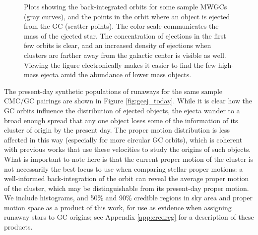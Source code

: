\documentclass[twocolumn,linenumbers]{aastex631}
\begin{document}
\begin{figure*}
    \caption{
        Plots showing the back-integrated orbits for some sample MWGCs (gray curves), and the points in the orbit where an object is ejected from the GC (scatter points).
        The color scale communicates the mass of the ejected star.
        The concentration of ejections in the first few orbits is clear, and an increased density of ejections when clusters are farther away from the galactic center is visible as well.
        Viewing the figure electronically makes it easier to find the few high-mass ejecta amid the abundance of lower mass objects.
    }
    \label{fig:gc_orbit_ejections}
\end{figure*}

The present-day synthetic populations of runaways for the same sample CMC/GC pairings are shown in Figure \ref{fig:gcej_today}.
While it is clear how the GC orbits influence the distribution of ejected objects, the ejecta wander to a broad enough spread that any one object loses some of the information of its cluster of origin by the present day.
The proper motion distribution is less affected in this way (especially for more circular GC orbits), which is coherent with previous works that use these velocities to study the origins of such objects.
What is important to note here is that the current proper motion of the cluster is not necessarily the best locus to use when comparing stellar proper motions: a well-informed back-integration of the orbit can reveal the average proper motion of the cluster, which may be distinguishable from its present-day proper motion.
We include histograms, and 50\% and 90\% credible regions in sky area and proper motion space as a product of this work, for use as evidence when assigning runaway stars to GC origins; see Appendix \ref{app:credreg} for a description of these products.
\end{document}

